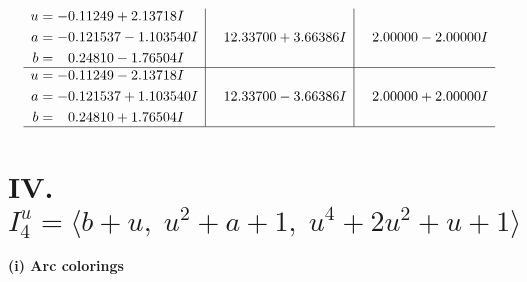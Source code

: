 \documentclass[1p]{elsarticle_modified}
\theoremstyle{definition}
\begin{document}
$$\begin{array}{c|c|c}
\begin{aligned}
u &= -0.11249 + 2.13718 I \\
a &= -0.121537 - 1.103540 I \\
b &= \phantom{-}0.24810 - 1.76504 I\end{aligned}
 & \phantom{-}12.33700 + 3.66386 I & \phantom{-}2.00000 - 2.00000 I \\ \hline\begin{aligned}
u &= -0.11249 - 2.13718 I \\
a &= -0.121537 + 1.103540 I \\
b &= \phantom{-}0.24810 + 1.76504 I\end{aligned}
 & \phantom{-}12.33700 - 3.66386 I & \phantom{-}2.00000 + 2.00000 I\\
 \hline 
 \end{array}$$\newpage\newpage\renewcommand{\arraystretch}{1}
\centering \section*{IV. $I^u_{4}= \langle b+u,\;u^2+a+1,\;u^4+2 u^2+u+1 \rangle$}
\flushleft \textbf{(i) Arc colorings}\\
\end{document}
